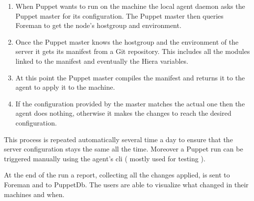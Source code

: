 \begin{enumerate}

\item When Puppet wants to run on the machine the local agent daemon asks
the Puppet master for its configuration. The Puppet master then queries
Foreman to get the node's hostgroup and environment.

\item Once the Puppet master knows the hostgroup and the environment of
the server it gets its manifest from a Git repository. This includes all
the modules linked to the manifest and eventually the Hiera variables.

\item At this point the Puppet master compiles the manifest and returns it
to the agent to apply it to the machine.

\item If the configuration provided by the master matches the actual one
then the agent does nothing, otherwise it makes the changes to reach the
desired configuration.

\end{enumerate}

This process is repeated automatically several time a day to ensure that
the server configuration stays the same all the time. Moreover a Puppet
run can be triggered manually using the agent's cli ( mostly used for
testing ).

At the end of the run a report, collecting all the changes applied, is
sent to Foreman and to PuppetDb. The users are able to visualize what
changed in their machines and when.
